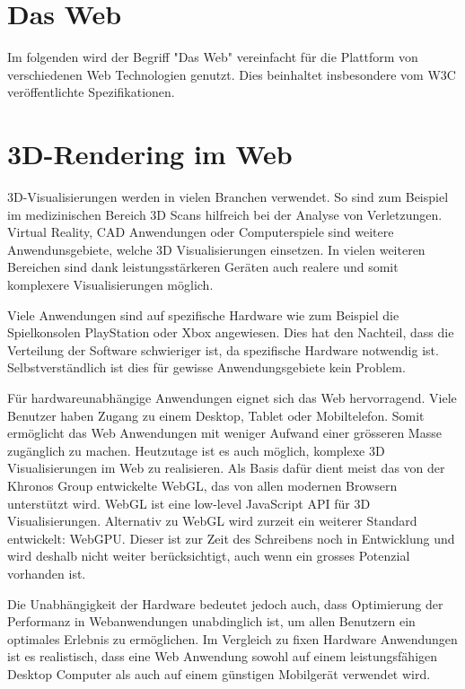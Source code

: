 \section{Das Web}
Im folgenden wird der Begriff "Das Web" vereinfacht für die Plattform von verschiedenen Web Technologien genutzt. Dies beinhaltet insbesondere vom W3C veröffentlichte Spezifikationen.

\section{3D-Rendering im Web}
3D-Visualisierungen werden in vielen Branchen verwendet.
So sind zum Beispiel im medizinischen Bereich 3D Scans hilfreich bei der Analyse von Verletzungen.
Virtual Reality, CAD Anwendungen oder Computerspiele sind weitere Anwendunsgebiete, welche 3D Visualisierungen einsetzen.
In vielen weiteren Bereichen sind dank leistungsstärkeren Geräten auch realere und somit komplexere Visualisierungen möglich.

Viele Anwendungen sind auf spezifische Hardware wie zum Beispiel die Spielkonsolen PlayStation oder Xbox angewiesen. Dies hat den Nachteil, dass die Verteilung der Software schwieriger ist, da spezifische Hardware notwendig ist. Selbstverständlich ist dies für gewisse Anwendungsgebiete kein Problem.

Für hardwareunabhängige Anwendungen eignet sich das Web hervorragend. Viele Benutzer haben Zugang zu einem Desktop, Tablet oder Mobiltelefon.
Somit ermöglicht das Web Anwendungen mit weniger Aufwand einer grösseren Masse zugänglich zu machen.
Heutzutage ist es auch möglich, komplexe 3D Visualisierungen im Web zu realisieren.
Als Basis dafür dient meist das von der Khronos Group entwickelte WebGL, das von allen modernen Browsern unterstützt wird. WebGL ist eine low-level JavaScript API für 3D Visualisierungen. \cite{webGl1Spec}
Alternativ zu WebGL wird zurzeit ein weiterer Standard entwickelt: WebGPU. Dieser ist zur Zeit des Schreibens noch in Entwicklung und wird deshalb nicht weiter berücksichtigt, auch wenn ein grosses Potenzial vorhanden ist. \cite{webGPUCharter}

Die Unabhängigkeit der Hardware bedeutet jedoch auch, dass Optimierung der Performanz in Webanwendungen unabdinglich ist, um allen Benutzern ein optimales Erlebnis zu ermöglichen.
Im Vergleich zu fixen Hardware Anwendungen ist es realistisch, dass eine Web Anwendung sowohl auf einem leistungsfähigen Desktop Computer als auch auf einem günstigen Mobilgerät verwendet wird.

